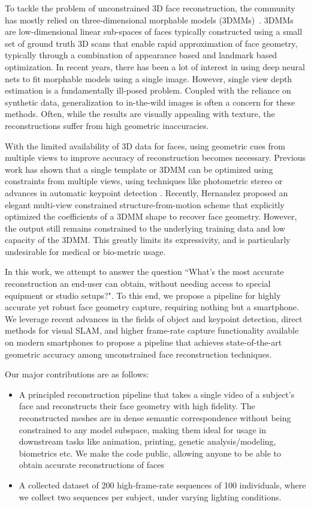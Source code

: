 \documentclass[10pt,twocolumn,letterpaper]{article}
\begin{document}
To tackle the problem of unconstrained 3D face reconstruction, the community has mostly relied on three-dimensional morphable models (3DMMs)~\cite{blanz1999morphable}. 3DMMs are low-dimensional linear sub-spaces of faces typically constructed using a small set of ground truth 3D scans that enable rapid approximation of face geometry, typically through a combination of appearance based and landmark based optimization. In recent years, there has been a lot of interest in using deep neural nets to fit morphable models using a single image. However, single view depth estimation is a fundamentally ill-posed problem. Coupled with the reliance on synthetic data, generalization to in-the-wild images is often a concern for these methods. Often, while the results are visually appealing with texture, the reconstructions suffer from high geometric inaccuracies.

With the limited availability of 3D data for faces, using geometric cues from multiple views to improve accuracy of reconstruction becomes necessary. Previous work has shown that a single template or 3DMM can be optimized using constraints from multiple views, using techniques like photometric stereo \cite{roth2015unconstrained} or advances in automatic keypoint detection \cite{huber2016multiresolution}.
Recently, Hernandez \etal \cite{hernandez2017accurate} proposed an elegant multi-view constrained structure-from-motion scheme that explicitly optimized the coefficients of a 3DMM shape to recover face geometry. However, the output still remains constrained to the underlying training data and low capacity of the 3DMM. This greatly limits its expressivity, and is particularly undesirable for medical or bio-metric usage. 


In this work, we attempt to answer the question ``What's the most accurate reconstruction an end-user can obtain, without needing access to special equipment or studio setups?". To this end, we propose a pipeline for highly accurate yet robust face geometry capture, requiring nothing but a smartphone. We leverage recent advances in the fields of object and keypoint detection, direct methods for visual SLAM, and higher frame-rate capture functionality available on modern smartphones to propose a pipeline that achieves state-of-the-art geometric accuracy among unconstrained face reconstruction techniques.

Our major contributions are as follows:
 \begin{itemize}
     \item  A principled reconstruction pipeline that takes a single video of a subject's face and reconstructs their face geometry with high fidelity. The reconstructed meshes are in dense semantic correspondence without being constrained to any model subspace, making them ideal for usage in downstream tasks like animation, printing, genetic analysis/modeling, biometrics etc. We make the code public, allowing anyone to be able to obtain accurate reconstructions of faces
     \item A collected dataset of 200 high-frame-rate  sequences of 100 individuals, where we collect two sequences per subject, under varying lighting conditions.
 \end{itemize}
\end{document}
